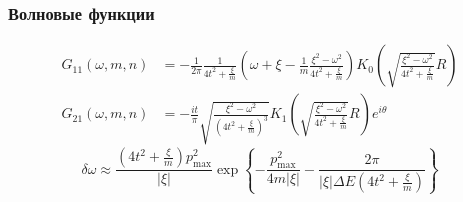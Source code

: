 \documentclass{beamer}
\begin{document}
\begin{frame}
    \frametitle{Волновые функции}
    \begin{equation}
        \begin{split}
            G_{11}(\omega, m, n) & = -\frac{1}{2\pi} \frac{1}{4t^2 + \frac{\xi}{m}}
            \left( \omega + \xi - \frac{1}{m} \frac{\xi^2 - \omega^2}{4t^2 + \frac{\xi}{m}} \right)
            K_0 \left(\sqrt{\frac{\xi^2 - \omega^2}{4t^2 + \frac{\xi}{m}}}R \right)\\
            G_{21}(\omega, m, n) & = -\frac{it}{\pi} \sqrt{\frac{\xi^2 - \omega^2}
                                         {(4t^2 + \frac{\xi}{m})^{3}}}
            K_1 \left(\sqrt{\frac{\xi^2 - \omega^2}{4t^2 + \frac{\xi}{m}}}R \right)e^{i\theta}
        \end{split}
    \end{equation}
    \begin{equation} 
        \label{impurity_energy}
        \delta \omega \approx \frac{\left(4t^2 + \frac{\xi}{m}\right)p_{\mathrm{max}}^2}{|\xi|}
                \exp\left\{ -\frac{p_{\mathrm{max}}^2}{4m|\xi|} - 
                            \frac{2\pi}{|\xi|\Delta E\left(4t^2 + \frac{\xi}{m}\right)}\right\}
    \end{equation}
\end{frame}
\end{document}
